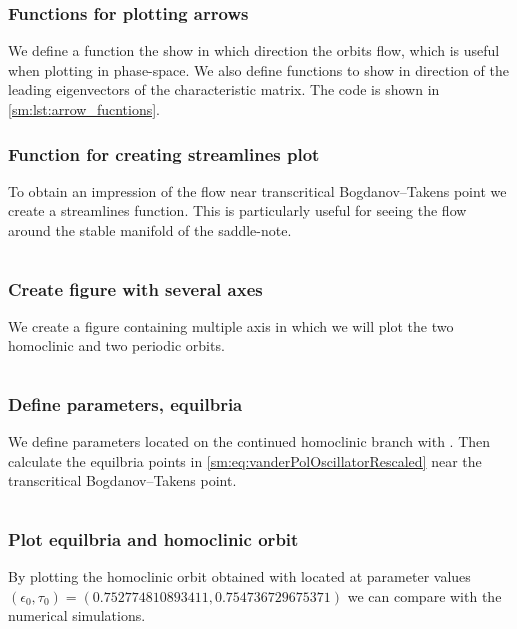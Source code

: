 \subsubsection{Functions for plotting arrows}
We define a function the show in which direction the orbits flow, which is
useful when plotting in phase-space. We also define functions to show in
direction of the leading eigenvectors of the characteristic matrix.
The code is shown in \cref{sm:lst:arrow_fucntions}.

\subsubsection{Function for creating streamlines plot}
To obtain an impression of the flow near transcritical Bogdanov--Takens point
we create a streamlines function. This is particularly useful for seeing the
flow around the stable manifold of the saddle-note.
\inputminted[firstline=65, lastline=77]{julia}{\pathToJuliaFiles/vdpo_simulation_article.jl}

\subsubsection{Create figure with several axes}
We create a figure containing multiple axis in which we will plot 
the two homoclinic and two periodic orbits.
\inputminted[firstline=79, lastline=84]{julia}{\pathToJuliaFiles/vdpo_simulation_article.jl}

\subsubsection{Define parameters, equilbria}
We define parameters located on the continued homoclinic branch with
\DDEBIFTOOL. Then calculate the equilbria points in
\cref{sm:eq:vanderPolOscillatorRescaled} near the transcritical
Bogdanov--Takens point.
\inputminted[firstline=86, lastline=93]{julia}{\pathToJuliaFiles/vdpo_simulation_article.jl}

\subsubsection{Plot equilbria and homoclinic orbit}
By plotting the homoclinic orbit obtained with \DDEBIFTOOL located at parameter
values $(\epsilon_0, \tau_0) =  (0.752774810893411,0.754736729675371)$ we can
compare with the numerical simulations.
\inputminted[firstline=95, lastline=101]{julia}{\pathToJuliaFiles/vdpo_simulation_article.jl}

